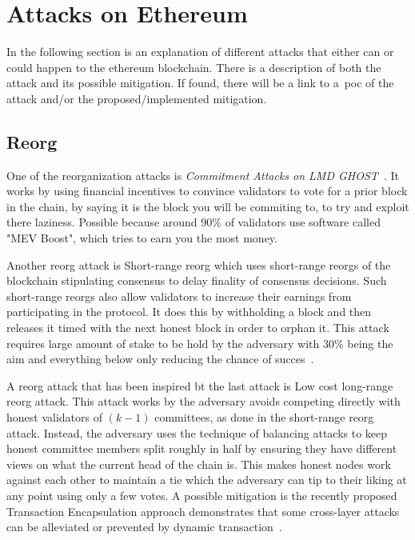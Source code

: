 
\section{Attacks on Ethereum}\label{sec:attacks-on-ethereum}
In the following section is an explanation of different attacks
that either can or could happen to the ethereum blockchain.
There is a description of both the attack and its possible mitigation.
If found, there will be a link to a~\gls{poc} of the attack and/or the proposed/implemented mitigation.
\subsection{Reorg}\label{subsec:reorg}
One of the reorganization attacks is \textit{Commitment Attacks on LMD GHOST}~\cite{sarenche2024breakingbalancepowercommitment}.
It works by using financial incentives to convince validators to vote for a prior block in the chain, by saying it is the block you will be commiting to, to try and exploit there laziness.
Possible because around 90\% of validators use software called "MEV Boost", which tries to earn you the most money.

Another reorg attack is Short-range reorg which uses short-range reorgs of the blockchain stipulating consensus to delay finality of consensus decisions.
Such short-range reorgs also allow validators to increase their earnings from participating in the protocol.
It does this by withholding a block and then releases it timed with the next honest block in order to orphan it.
This attack requires large amount of stake to be hold by the adversary with 30\% being the aim and everything below only reducing the chance of succes~\cite{10.1007/978-3-031-18283-9_28}.

A reorg attack that has been inspired bt the last attack is Low cost long-range reorg attack.
This attack works by the adversary avoids competing directly with honest validators of $(k − 1)$ committees, as done in the short-range reorg attack.
Instead, the adversary uses the technique of balancing attacks to keep honest committee members split roughly in half by ensuring they have different views on what the current head of the chain is.
This makes honest nodes work against each other to maintain a tie which the adversary can tip to their liking at any point using only a few votes.
A possible mitigation is the recently proposed Transaction Encapsulation approach demonstrates that some cross-layer attacks can be alleviated or prevented by dynamic transaction~\cite{10.1007/978-3-031-18283-9_28}.

